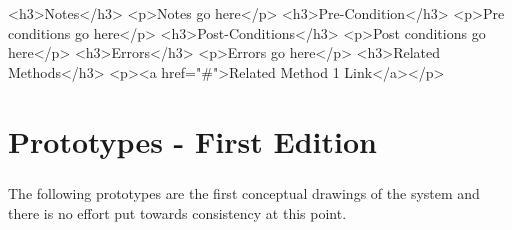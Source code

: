\documentclass[letterpaper,12pt]{report}
\begin{document}
{\newline
\hspace*{0.5cm}<h3>Notes</h3>\linebreak
\hspace*{1cm}<p>Notes go here</p>\linebreak
\newline
\hspace*{0.5cm}<h3>Pre-Condition</h3>\linebreak
\hspace*{1cm}<p>Pre conditions go here</p>\linebreak
\newline
\hspace*{0.5cm}<h3>Post-Conditions</h3>\linebreak
\hspace*{1cm}<p>Post conditions go here</p>\linebreak
\newline
\hspace*{0.5cm}<h3>Errors</h3>\linebreak
\hspace*{1cm}<p>Errors go here</p>\linebreak
\newline
\hspace*{0.5cm}<h3>Related Methods</h3>\linebreak
\hspace*{1cm}<p><a href="\#">Related Method 1 Link</a></p>\linebreak }




\chapter{Prototypes - First Edition}
\paragraph*{}\hspace{0.6cm}The following prototypes are the first conceptual drawings of the system and there is no effort put towards consistency at this point.
\end{document}
